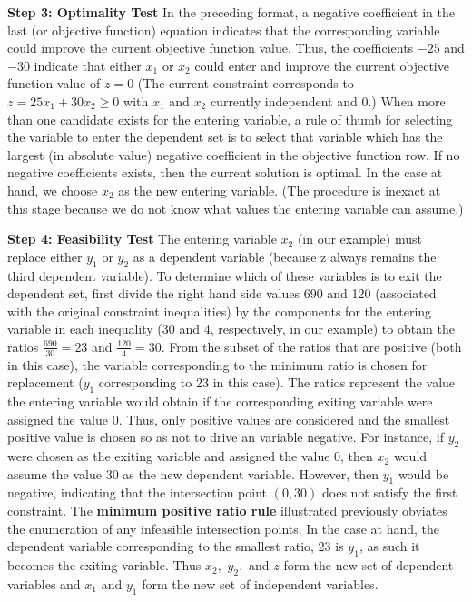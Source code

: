 \begin{example}
\textbf{Step 3: Optimality Test}\newline
In the preceding format, a negative coefficient in the last (or objective function) equation indicates that the corresponding variable could improve the current objective function value. Thus, the coefficients $-25$ and $-30$ indicate that either $x_1$ or $x_2$ could enter and improve the current objective function value of $z=0$ (The current constraint corresponds to $z = 25x_1 + 30x_2 \geq 0$ with $x_1$ and $x_2$ currently independent and 0.) When more than one candidate exists for the entering variable, a rule of thumb for selecting the variable to enter the dependent set is to select that variable which has the largest (in absolute value) negative coefficient in the objective function row. If no negative coefficients exists, then the current solution is optimal. In the case at hand, we choose $x_2$ as the new entering variable. (The procedure is inexact at this stage because we do not know what values the entering variable can assume.) \newline

\textbf{Step 4: Feasibility Test}\newline
The entering variable $x_2$ (in our example) must replace either $y_1$ or $y_2$ as a dependent variable (because z always remains the third dependent variable). To determine which of these variables is to exit the dependent set, first divide the right hand side values 690 and 120 (associated with the original constraint inequalities) by the components for the entering variable in each inequality (30 and 4, respectively, in our example) to obtain the ratios $\frac{690}{30} = 23$ and $\frac{120}{4} = 30.$ From the subset of the ratios that are positive (both in this case), the variable corresponding to the minimum ratio is chosen for replacement ($y_1$ corresponding to 23 in this case). The ratios represent the value the entering variable would obtain if the corresponding exiting variable were assigned the value 0. Thus, only positive values are considered and the smallest positive value is chosen so as not to drive an variable negative. For instance, if $y_2$ were chosen as the exiting variable and assigned the value 0, then $x_2$ would assume the value 30 as the new dependent variable. However, then $y_1$ would be negative, indicating that the intersection point $(0,30)$ does not satisfy the first constraint. The \textbf{minimum positive ratio rule} illustrated previously obviates the enumeration of any infeasible intersection points. In the case at hand, the dependent variable corresponding to the smallest ratio, 23 is $y_1$, as such it becomes the exiting variable. Thus $x_2,$ $y_2,$ and $z$ form the new set of dependent variables and $x_1$ and $y_1$ form the new set of independent variables.\newline


\end{example}
